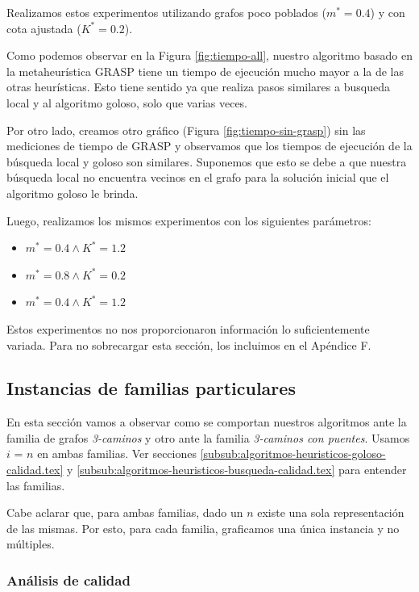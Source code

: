 Realizamos estos experimentos utilizando grafos poco poblados ($m^* = 0.4$) y con cota ajustada ($K^* = 0.2$).

Como podemos observar en la Figura \ref{fig:tiempo-all}, nuestro algoritmo basado en la metaheurística GRASP tiene un tiempo de ejecución mucho mayor a la de las otras heurísticas. Esto tiene sentido ya que realiza pasos similares a busqueda local y al algoritmo goloso, solo que varias veces.

Por otro lado, creamos otro gráfico (Figura \ref{fig:tiempo-sin-grasp}) sin las mediciones de tiempo de GRASP y observamos que los tiempos de ejecución de la búsqueda local y goloso son similares. Suponemos que esto se debe a que nuestra búsqueda local no encuentra vecinos en el grafo para la solución inicial que el algoritmo goloso le brinda.

Luego, realizamos los mismos experimentos con los siguientes parámetros:

\begin{itemize}
 \item $m^* = 0.4 \wedge K^* = 1.2$
 \item $m^* = 0.8 \wedge K^* = 0.2$
 \item $m^* = 0.4 \wedge K^* = 1.2$
\end{itemize}

Estos experimentos no nos proporcionaron información lo suficientemente variada. Para no sobrecargar esta sección, los incluimos en el Apéndice F.

\subsection{Instancias de familias particulares}

En esta sección vamos a observar como se comportan nuestros algoritmos ante la familia de grafos \emph{3-caminos} y otro ante la familia \emph{3-caminos con puentes}. Usamos $i$ = $n$ en ambas familias. Ver secciones \ref{subsub:algoritmos-heuristicos-goloso-calidad.tex} y \ref{subsub:algoritmos-heuristicos-busqueda-calidad.tex} para entender las familias.

Cabe aclarar que, para ambas familias, dado un $n$ existe una sola representación de las mismas. Por esto, para cada familia, graficamos una única instancia y no múltiples.

\subsubsection{Análisis de calidad}

